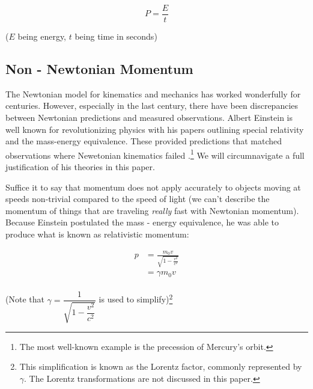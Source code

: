\documentclass{article}
\begin{document}
                \begin{equation}\label{eq:6}
                    P = \frac{E}{t}
                \end{equation}
                \begin{center}
                    ($E$ being energy, $t$ being time in seconds)
                \end{center}

        \subsection{Non - Newtonian Momentum}
            The Newtonian model for kinematics and mechanics has worked wonderfully for centuries. However, especially in the last century, there have been discrepancies between Newtonian predictions and measured observations.
            Albert Einstein is well known for revolutionizing physics with his papers outlining special relativity and the mass-energy equivalence. These provided predictions that matched observations where Newetonian kinematics failed \cite{Einstein1}.\footnote{The most well-known example is the precession of Mercury's orbit.}
            We will circumnavigate a full justification of his theories in this paper.
            \par
            Suffice it to say that momentum does not apply accurately to objects moving at speeds non-trivial compared to the speed of light (we can't describe the momentum of things that are traveling \emph{really} fast with Newtonian momentum).
            Because Einstein postulated the mass - energy equivalence, he was able to produce what is known as relativistic momentum:

            \begin{equation}\label{eq:7}
                \begin{split}
                    p & = \frac{m_0v}{\sqrt{1 - \frac{v^2}{c^2}}} \\
                    & = \gamma m_0v \\
                \end{split}
            \end{equation}
            \begin{center}
                (Note that $\gamma = \dfrac{1}{\sqrt{1 - \dfrac{v^2}{c^2}}}$ is used to simplify)\footnote{This simplification is known as the Lorentz factor, commonly represented by $\gamma$. The Lorentz transformations are not discussed in this paper.}
            \end{center}
\end{document}
